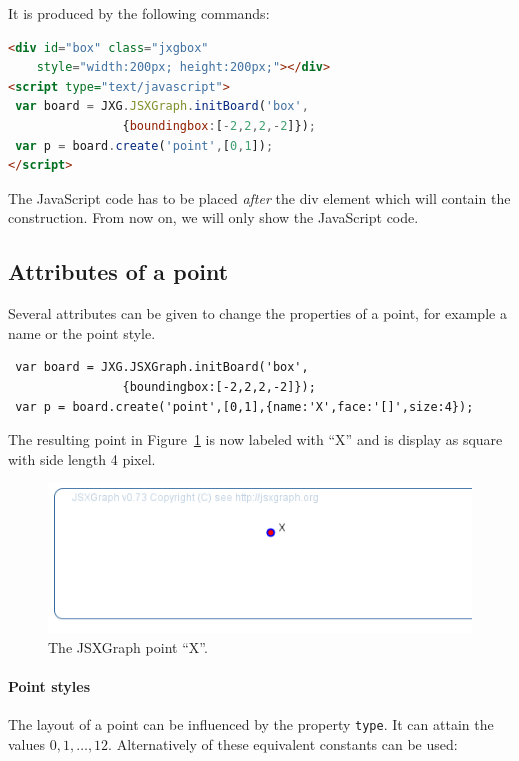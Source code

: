 \noindent It is produced by the following commands:
\begin{lstlisting}[language=html]
<div id="box" class="jxgbox" 
    style="width:200px; height:200px;"></div>
<script type="text/javascript">
 var board = JXG.JSXGraph.initBoard('box', 
                {boundingbox:[-2,2,2,-2]});
 var p = board.create('point',[0,1]);
</script>
\end{lstlisting}

The JavaScript code has to be placed {\sl after} the div element which will contain the construction. From now on, we will only show the JavaScript code. 

\subsection{Attributes of a point}
Several attributes can be given to change the properties of a point, for example a name or the point style. 
\begin{lstlisting}
 var board = JXG.JSXGraph.initBoard('box', 
                {boundingbox:[-2,2,2,-2]});
 var p = board.create('point',[0,1],{name:'X',face:'[]',size:4});
\end{lstlisting}
The resulting point in Figure~\ref{fig:3} is now labeled with ``X'' and is display as square with side length 4 pixel.
\begin{figure}[htb]
\includegraphics[width=0.4\linewidth]{images/b4.png}
\caption{The JSXGraph point ``X''.}\label{fig:3}
\end{figure}

\paragraph{Point styles}
The layout of a point can be influenced by the property \lstinline|type|. It can attain the values $0,1,\ldots,12$. 
Alternatively of these equivalent constants can be used:


